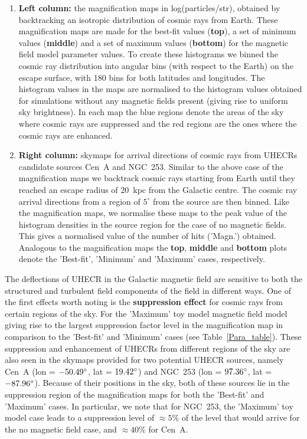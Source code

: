 \documentclass[usenatbib]{mnras}
\begin{document}
\begin{enumerate}
    \item {\bf Left column: } the magnification maps in log(particles/str), obtained by backtracking an isotropic distribution of cosmic rays from Earth. These magnification maps are made for the best-fit values (\textbf{top}), a set of minimum values (\textbf{middle}) and a set of maximum values (\textbf{bottom}) for the magnetic field model parameter values.
    To create these histograms we binned the cosmic ray distribution into angular bins (with respect to the Earth) on the escape surface, with 180 bins for both latitudes and longitudes. The histogram values in the maps are normalised to the histogram values obtained for simulations without any magnetic fields present (giving rise to uniform sky brightness). In each map the blue regions denote the areas of the sky where cosmic rays are suppressed and the red regions are the ones where the cosmic rays are enhanced.
    
    \item {\bf Right column: } skymaps for arrival directions
    of cosmic rays from UHECRs candidate sources Cen~A and NGC~253. Similar to the above case of the magnification maps we backtrack cosmic rays starting from Earth until they reached an escape radius of 20~kpc from the Galactic centre. The cosmic ray arrival directions from a region of $5^{\circ}$ from the source are then binned.  Like the magnification maps, we normalise these maps to the peak value of the histogram densities in the source region for the case of no magnetic fields.  This gives a normalised value of the number of hits ('Magn.') obtained. Analogous to the magnification maps the \textbf{top}, \textbf{middle} and \textbf{bottom} plots denote the 'Best-fit', 'Minimum' and 'Maximum' cases, respectively. 
    \end{enumerate}

The deflections of UHECR in the Galactic magnetic field are sensitive to both the structured and turbulent field components of the field in different ways. One of the first effects worth noting is the {\bf suppression effect} for cosmic rays from certain regions of the sky. For the 'Maximum' toy model magnetic field model giving rise to the largest suppression factor level in the magnification map in comparison to the 'Best-fit' and 'Minimum' cases (see Table~\ref{Para_table}). These suppression and enhancement of UHECRs from different regions of the sky are also seen in the skymaps provided for two potential UHECR sources, namely Cen~A (lon = $\rm -50.49^{\circ}$, lat = $\rm 19.42^{\circ}$) and NGC~253 (lon = $\rm 97.36^{\circ}$, lat = $\rm -87.96^{\circ}$). Because of their positions in the sky, both of these sources lie in the suppression region of the magnification maps for both the 'Best-fit' and 'Maximum' cases. In particular, we note that for NGC~253, the 'Maximum' toy model case leads to a suppression level of $\approx 5\%$ of the level that would arrive for the no magnetic field case, and $\approx 40\%$ for Cen~A.
\end{document}
